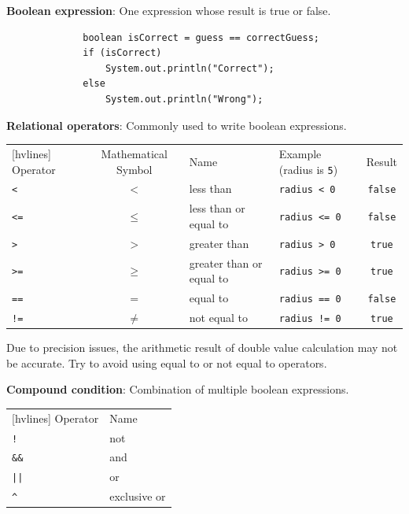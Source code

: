 \documentclass{article}
\begin{document}
\textbf{Boolean expression}: One expression whose result is true or false.

\begin{figure}[h]
	\centering
	\begin{verbatim}
		boolean isCorrect = guess == correctGuess;
		if (isCorrect)
		    System.out.println("Correct");
		else
		    System.out.println("Wrong");
	\end{verbatim}
\end{figure}

\textbf{Relational operators}: Commonly used to write boolean expressions.

\begin{table}[h!]
	\centering
	\begin{NiceTabular}{||lcllc||}[hvlines]
		\RowStyle{\bfseries}Operator & Mathematical Symbol & Name & Example (radius is \texttt{5}) & Result\\
		\texttt{<} & $<$ & less than & \texttt{radius < 0} & \texttt{false}\\
		\texttt{<=} & $\leq$ & less than or equal to & \texttt{radius <= 0} & \texttt{false}\\
		\texttt{>} & $>$ & greater than & \texttt{radius > 0} & \texttt{true}\\
		\texttt{>=} & $\geq$ & greater than or equal to & \texttt{radius >= 0} & \texttt{true}\\
		\texttt{==} & $=$ & equal to & \texttt{radius == 0} & \texttt{false}\\
		\texttt{!=} & $\neq$ & not equal to & \texttt{radius != 0} & \texttt{true}
	\end{NiceTabular}
\end{table}

Due to precision issues, the arithmetic result of double value calculation may not be accurate. Try to avoid using equal to or not equal to operators.
\newpage

\textbf{Compound condition}: Combination of multiple boolean expressions.

\begin{table}[h!]
	\centering
	\begin{NiceTabular}{||ll||}[hvlines]
		\RowStyle{\bfseries}Operator & Name\\
		\texttt{!} & not\\
		\texttt{\&\&} & and\\
		\texttt{||} & or\\
		\texttt{\^} & exclusive or
	\end{NiceTabular}
\end{table}
\end{document}
